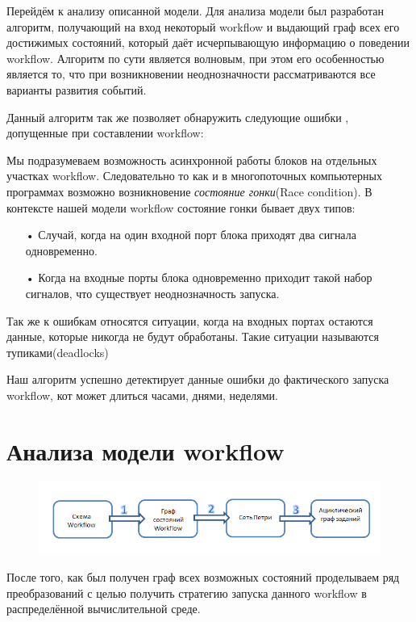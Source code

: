 \documentclass[a4paper,14pt]{article}
\begin{document}
 Перейдём к анализу описанной модели.
 Для анализа модели был разработан алгоритм, получающий на вход некоторый workflow и выдающий граф всех его достижимых состояний, который даёт исчерпывающую информацию о поведении workflow.
 Алгоритм по сути является волновым, при этом его особенностью является то, что при возникновении неоднозначности рассматриваются все варианты развития событий.
 
 
 Данный алгоритм так же позволяет обнаружить следующие ошибки , допущенные при составлении workflow:
 

Мы подразумеваем возможность асинхронной работы блоков на отдельных участках workflow. Следовательно то как и в многопоточных компьютерных программах возможно возникновение \textit{состояние гонки}(Race condition). 
В контексте нашей модели workflow состояние гонки бывает двух типов:
\begin{enumerate}
\item[•] Случай, когда на один входной порт блока приходят два сигнала одновременно.
\item[•] Когда на входные порты блока одновременно приходит такой набор сигналов, что существует неоднозначность запуска.

\end{enumerate}

Так же к ошибкам относятся  ситуации, когда на входных портах остаются данные, которые никогда не будут обработаны. Такие ситуации называются тупиками(deadlocks)

Наш алгоритм успешно детектирует данные ошибки до фактического запуска workflow, кот может длиться часами, днями, неделями.




\section{Анализа модели workflow}
\begin{figure}[here]
    \centering
    \includegraphics[width=\textwidth]{analys_plan.png}

    \label{img:opt_wf}
\end{figure}

После того, как был получен граф всех возможных состояний проделываем ряд преобразований с целью получить стратегию запуска данного workflow в распределённой вычислительной среде.
\end{document}
